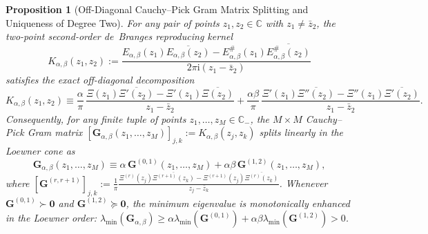 \documentclass[11pt,reqno]{amsart}
\newtheorem{proposition}[theorem]{Proposition}
\theoremstyle{definition}
\theoremstyle{remark}
\numberwithin{equation}{section}
\newcommand{\C}{\mathbb{C}}
\newcommand{\ii}{\mathrm{i}}
\begin{document}
\begin{proposition}[Off-Diagonal Cauchy--Pick Gram Matrix Splitting and Uniqueness of Degree Two]\label{prop:cauchy_pick_splitting}
For any pair of points $z_1, z_2 \in \C$ with $z_1 \neq \bar{z}_2$, the two-point second-order de~Branges reproducing kernel
\begin{equation}\label{eq:two_point_kernel_def}
K_{\alpha,\beta}(z_1, z_2) := \frac{E_{\alpha,\beta}(z_1)\overline{E_{\alpha,\beta}(z_2)} - E_{\alpha,\beta}^\#(z_1)\overline{E_{\alpha,\beta}^\#(z_2)}}{2\pi\ii(z_1 - \bar{z}_2)}
\end{equation}
satisfies the exact off-diagonal decomposition
\begin{equation}\label{eq:two_point_kernel_split}
K_{\alpha,\beta}(z_1, z_2) \equiv \frac{\alpha}{\pi}\,\frac{\Xi(z_1)\overline{\Xi'(z_2)} - \Xi'(z_1)\overline{\Xi(z_2)}}{z_1 - \bar{z}_2} + \frac{\alpha\beta}{\pi}\,\frac{\Xi'(z_1)\overline{\Xi''(z_2)} - \Xi''(z_1)\overline{\Xi'(z_2)}}{z_1 - \bar{z}_2}.
\end{equation}
Consequently, for any finite tuple of points $z_1, \dots, z_M \in \C_-$, the $M \times M$ Cauchy--Pick Gram matrix $[\mathbf{G}_{\alpha,\beta}(z_1,\dots,z_M)]_{j,k} := K_{\alpha,\beta}(z_j, z_k)$ splits linearly in the Loewner cone as
\begin{equation}\label{eq:gram_matrix_split}
\mathbf{G}_{\alpha,\beta}(z_1, \dots, z_M) \equiv \alpha\,\mathbf{G}^{(0,1)}(z_1, \dots, z_M) + \alpha\beta\,\mathbf{G}^{(1,2)}(z_1, \dots, z_M),
\end{equation}
where $[\mathbf{G}^{(r,r+1)}]_{j,k} := \frac{1}{\pi}\frac{\Xi^{(r)}(z_j)\overline{\Xi^{(r+1)}(z_k)} - \Xi^{(r+1)}(z_j)\overline{\Xi^{(r)}(z_k)}}{z_j - \bar{z}_k}$. Whenever $\mathbf{G}^{(0,1)} \succ \mathbf{0}$ and $\mathbf{G}^{(1,2)} \succeq \mathbf{0}$, the minimum eigenvalue is monotonically enhanced in the Loewner order: $\lambda_{\min}(\mathbf{G}_{\alpha,\beta}) \ge \alpha\lambda_{\min}(\mathbf{G}^{(0,1)}) + \alpha\beta\lambda_{\min}(\mathbf{G}^{(1,2)}) > 0$.
\end{proposition}
\end{document}
